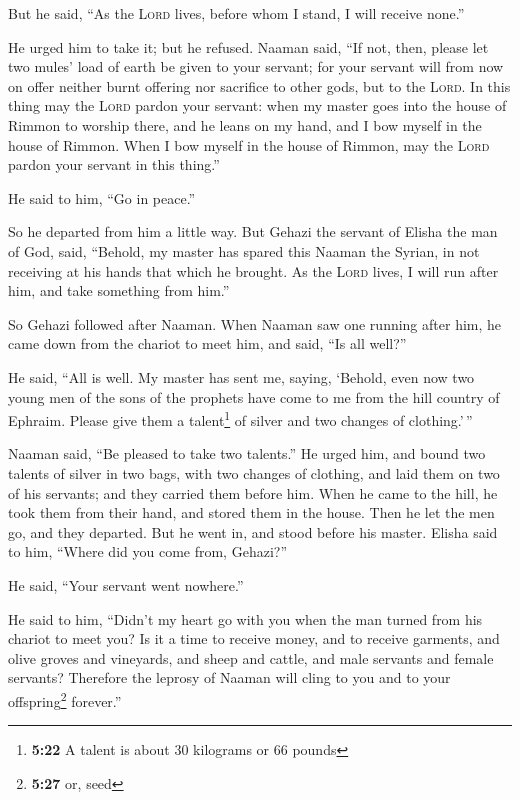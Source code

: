  But he said, ``As the \textsc{Lord} lives, before whom I
stand, I will receive none.''

He urged him to take it; but he refused.  Naaman said,
``If not, then, please let two mules' load of earth be given to your
servant; for your servant will from now on offer neither burnt offering
nor sacrifice to other gods, but to the \textsc{Lord}. 
In this thing may the \textsc{Lord} pardon your servant: when my master
goes into the house of Rimmon to worship there, and he leans on my hand,
and I bow myself in the house of Rimmon. When I bow myself in the house
of Rimmon, may the \textsc{Lord} pardon your servant in this thing.''

 He said to him, ``Go in peace.''

So he departed from him a little way.  But Gehazi the
servant of Elisha the man of God, said, ``Behold, my master has spared
this Naaman the Syrian, in not receiving at his hands that which he
brought. As the \textsc{Lord} lives, I will run after him, and take
something from him.''

 So Gehazi followed after Naaman. When Naaman saw one
running after him, he came down from the chariot to meet him, and said,
``Is all well?''

 He said, ``All is well. My master has sent me, saying,
`Behold, even now two young men of the sons of the prophets have come to
me from the hill country of Ephraim. Please give them a
talent\footnote{\textbf{5:22} A talent is about 30 kilograms or 66
  pounds} of silver and two changes of clothing.'\,''

 Naaman said, ``Be pleased to take two talents.'' He
urged him, and bound two talents of silver in two bags, with two changes
of clothing, and laid them on two of his servants; and they carried them
before him.  When he came to the hill, he took them from
their hand, and stored them in the house. Then he let the men go, and
they departed.  But he went in, and stood before his
master. Elisha said to him, ``Where did you come from, Gehazi?''

He said, ``Your servant went nowhere.''

 He said to him, ``Didn't my heart go with you when the
man turned from his chariot to meet you? Is it a time to receive money,
and to receive garments, and olive groves and vineyards, and sheep and
cattle, and male servants and female servants?  Therefore
the leprosy of Naaman will cling to you and to your offspring\footnote{\textbf{5:27}
  or, seed} forever.''

